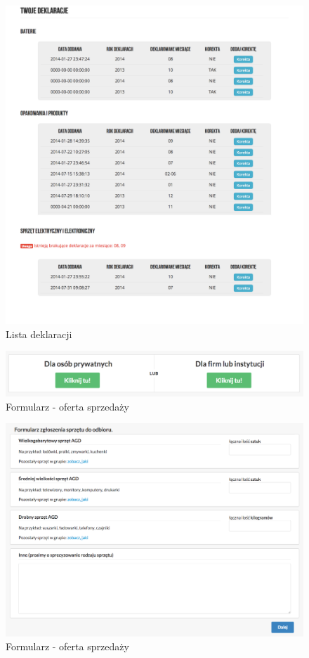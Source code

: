 	\begin{figure}[H]
		\centering
		\centerline{\includegraphics[width=1.2\textwidth]{partials/2-wymagania/dokumenty/deklaracje-lista.png}}
		\caption{Lista deklaracji}
	\end{figure}

	\begin{figure}[H]
		\centering
		\centerline{\includegraphics[width=1.2\textwidth]{partials/2-wymagania/dokumenty/oferta-choice.png}}
		\caption{Formularz - oferta sprzedaży}
	\end{figure}

	\begin{figure}[H]
		\centering
		\centerline{\includegraphics[width=1.2\textwidth]{partials/2-wymagania/dokumenty/oferta-sprzet.png}}
		\caption{Formularz - oferta sprzedaży}
	\end{figure}

